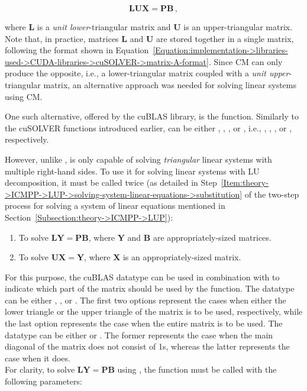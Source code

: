 \begin{equation}
	\mathbf{LUX} = \mathbf{PB} \,,
	\label{Equation:implementation->libraries-used->CUDA-libraries->cuBLAS->cusolverDnXgetrs-system-of-equations}
\end{equation}

where $\mathbf{L}$ is a \textit{unit lower}-triangular matrix and $\mathbf{U}$ is an upper-triangular matrix. Note that, in practice, matrices $\mathbf{L}$ and $\mathbf{U}$ are stored together in a single matrix, following the format shown in Equation~\ref{Equation:implementation->libraries-used->CUDA-libraries->cuSOLVER->matrix-A-format}. Since CM can only produce the opposite, i.e., a lower-triangular matrix coupled with a \textit{unit upper}-triangular matrix, an alternative approach was needed for solving linear systems using CM.

One such alternative, offered by the cuBLAS library, is the  function. Similarly to the cuSOLVER functions introduced earlier,  can be either , , , or , i.e., , , , or , respectively.

However, unlike ,  is only capable of solving \textit{triangular} linear systems with multiple right-hand sides. To use it for solving linear systems with LU decomposition, it must be called twice (as detailed in Step~\ref{Item:theory->ICMPP->LUP->solving-system-linear-equations->substitution} of the two-step process for solving a system of linear equations mentioned in Section~\ref{Subsection:theory->ICMPP->LUP}):

\begin{enumerate}
	\item To solve $\mathbf{LY}=\mathbf{PB}$, where $\mathbf{Y}$ and $\mathbf{B}$ are appropriately-sized matrices.
	\item To solve $\mathbf{UX}=\mathbf{Y}$, where $\mathbf{X}$ is an appropriately-sized matrix.
\end{enumerate}

For this purpose, the cuBLAS datatype  can be used in combination with  to indicate which part of the matrix should be used by the  function. The  datatype can be either , , or . The first two options represent the cases when either the lower triangle or the upper triangle of the matrix is to be used, respectively, while the last option represents the case when the entire matrix is to be used. The  datatype can be either  or . The former represents the case when the main diagonal of the matrix does not consist of 1s, whereas the latter represents the case when it does.\\
For clarity, to solve $\mathbf{LY}=\mathbf{PB}$ using , the function must be called with the following parameters:

